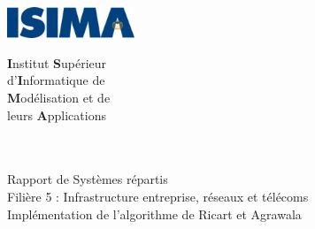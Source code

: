 \begin{titlepage}
	\begin{minipage}{0.5\textwidth}
		\begin{flushleft} \large
			\includegraphics[width=3.8cm]{images/logo-isima.jpg}\\
		\end{flushleft}
	\end{minipage}
	\begin{minipage}{0.43\textwidth}
		\begin{flushright} \large
		\end{flushright}
	\end{minipage}

	\begin{minipage}{0.5\textwidth}
		\begin{flushleft} \large
			\textbf{I}nstitut \textbf{S}upérieur\\
			d'\textbf{I}nformatique de\\
			\textbf{M}odélisation et de\\
			leurs \textbf{A}pplications\\
			~\\
		\end{flushleft}
	\end{minipage}
	\begin{minipage}{0.43\textwidth}
		\begin{flushright} \large
		\end{flushright}
	\end{minipage}


		\vfill
		\begin{center}
			\Hrule \\[0.4cm]
			\Large{Rapport de Systèmes répartis}\\		
			\Large Filière 5 : Infrastructure entreprise, réseaux et télécoms\\[1.0cm]
			\Huge{Implémentation de l'algorithme de Ricart et Agrawala}\\
			\Hrule\\[0.8cm]
\vfill 
		\end{center}
		

\end{titlepage}
